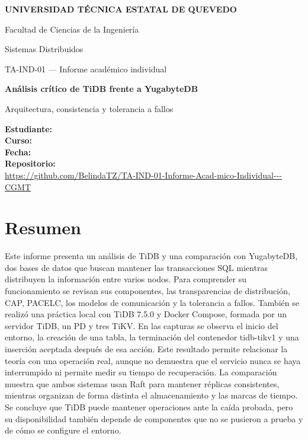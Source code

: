 \documentclass[11pt,a4paper]{article}
\begin{document}
\hypersetup{pageanchor=false}
\begin{titlepage}
\centering
{\Large\bfseries UNIVERSIDAD TÉCNICA ESTATAL DE QUEVEDO\par}
\vspace{.5cm}
{\large Facultad de Ciencias de la Ingeniería\par}
{\large \carrera\par}
\vspace{1.5cm}
{\large Sistemas Distribuidos\par}
{\large TA-IND-01 --- Informe académico individual\par}
\vspace{1.5cm}
{\LARGE\bfseries Análisis crítico de TiDB frente a YugabyteDB\par}
\vspace{.6cm}
{\large Arquitectura, consistencia y tolerancia a fallos\par}
\vfill
\begin{flushleft}
\textbf{Estudiante:} \estudiante\\[.4em]
\textbf{Curso:} \paralelo\\[.4em]
\textbf{Fecha:} \fecharevision\\[.4em]
\textbf{Repositorio:}\\
\url{https://github.com/BelindaTZ/TA-IND-01-Informe-Acad-mico-Individual---CGMT}
\end{flushleft}
\vspace{.8cm}

\end{titlepage}
\hypersetup{pageanchor=true}
\setcounter{page}{1}

\section*{Resumen}
Este informe presenta un análisis de TiDB y una comparación con YugabyteDB, dos bases de datos que buscan mantener las transacciones SQL mientras distribuyen la información entre varios nodos. Para comprender su funcionamiento se revisan sus componentes, las transparencias de distribución, CAP, PACELC, los modelos de comunicación y la tolerancia a fallos. También se realizó una práctica local con TiDB 7.5.0 y Docker Compose, formada por un servidor TiDB, un PD y tres TiKV. En las capturas se observa el inicio del entorno, la creación de una tabla, la terminación del contenedor tidb-tikv1 y una inserción aceptada después de esa acción. Este resultado permite relacionar la teoría con una operación real, aunque no demuestra que el servicio nunca se haya interrumpido ni permite medir su tiempo de recuperación. La comparación muestra que ambos sistemas usan Raft para mantener réplicas consistentes, mientras organizan de forma distinta el almacenamiento y las marcas de tiempo. Se concluye que TiDB puede mantener operaciones ante la caída probada, pero su disponibilidad también depende de componentes que no se pusieron a prueba y de cómo se configure el entorno.
\end{document}
